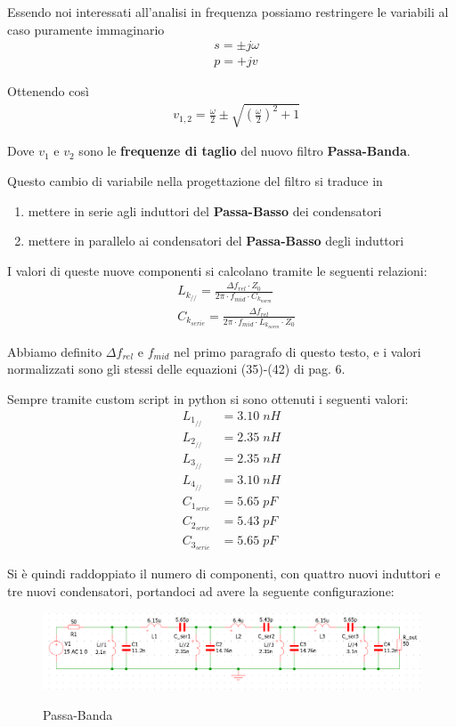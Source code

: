 \documentclass[a4paper,12pt]{report}
\begin{document}
Essendo noi interessati all'analisi in frequenza possiamo restringere le variabili al caso puramente immaginario
\begin{align}
&s = \pm j\omega\\
&p = +jv
\end{align}

Ottenendo così
\begin{align}
&v_{1,2} = \frac{\omega}{2} \pm \sqrt{\left(\frac{\omega}{2}\right)^2 + 1}
\end{align}

Dove $v_1$ e $v_2$ sono le \textbf{frequenze di taglio} del nuovo filtro \textbf{Passa-Banda}.

Questo cambio di variabile nella progettazione del filtro si traduce in
\begin{enumerate}
	\item mettere in serie agli induttori del \textbf{Passa-Basso} dei condensatori
	\item mettere in parallelo ai condensatori del \textbf{Passa-Basso} degli induttori
\end{enumerate}

I valori di queste nuove componenti si calcolano tramite le seguenti relazioni:
\begin{align}
&L_{k_{//}} = \frac{\Delta f_{rel} \cdot Z_0}{2\pi\cdot f_{mid} \cdot C_{k_{norm}}}\\
&C_{k_{serie}} = \frac{\Delta f_{rel}}{2\pi\cdot f_{mid} \cdot L_{k_{norm}} \cdot Z_0}
\end{align}

Abbiamo definito $\Delta f_{rel}$ e $f_{mid}$ nel primo paragrafo di questo testo, e i valori normalizzati sono gli stessi delle equazioni (35)-(42) di pag. 6.

Sempre tramite custom script in python si sono ottenuti i seguenti valori:
\begin{align}
L_{1_{//}} &= 3.10 \; nH\\
L_{2_{//}} &= 2.35 \; nH\\
L_{3_{//}} &= 2.35 \; nH\\
L_{4_{//}} &= 3.10 \; nH\\
C_{1_{serie}} &= 5.65 \; pF\\
C_{2_{serie}} &= 5.43 \; pF\\
C_{3_{serie}} &= 5.65 \; pF
\end{align}

\newpage

Si è quindi raddoppiato il numero di componenti, con quattro nuovi induttori e tre nuovi condensatori, portandoci ad avere la seguente configurazione:
\begin{figure}[!htb]
	\centering
	\includegraphics[width=\textwidth]{passa_banda.png}
	\label{lelz}
	\caption{\label{kokwz} \small Passa-Banda}
\end{figure}
\end{document}
